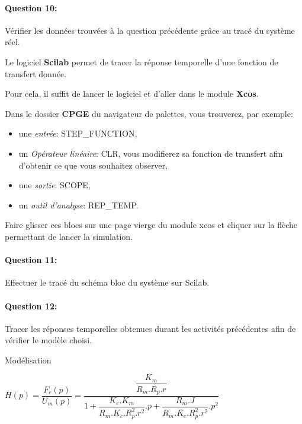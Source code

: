 \paragraph{Question 10:} Vérifier les données trouvées à la question précédente grâce au tracé du système réel.
 
\ifdef{\public}{\cleardoublepage}{}


Le logiciel \textbf{Scilab} permet de tracer la réponse temporelle d'une fonction de transfert donnée.

Pour cela, il suffit de lancer le logiciel et d'aller dans le module \textbf{Xcos}.

Dans le dossier \textbf{CPGE} du navigateur de palettes, vous trouverez, par exemple:
\begin{itemize}
 \item une \textit{entrée}: STEP\_FUNCTION,
 \item un \textit{Opérateur linéaire}: CLR, vous modifierez sa fonction de transfert afin d'obtenir ce que vous souhaitez observer,
 \item une \textit{sortie}: SCOPE,
 \item un \textit{outil d'analyse}: REP\_TEMP.
\end{itemize}

Faire glisser ces blocs sur une page vierge du module xcos et cliquer sur la flèche permettant de lancer la simulation.

\paragraph{Question 11:} Effectuer le tracé du schéma bloc du système sur Scilab.

\paragraph{Question 12:} Tracer les réponses temporelles obtenues durant les activités précédentes afin de vérifier le modèle choisi.

\ifdef{\public}{}{}

\newpage

\pagestyle{correction}\setcounter{section}{0}

Modélisation
\begin{center}
$H(p)=\dfrac{F_c(p)}{U_m(p)}=\dfrac{\dfrac{K_m}{R_m.R_p.r}}{1+\dfrac{K_e.K_m}{R_m.K_c.R_p^2.r^2}.p+\dfrac{R_m.J}{R_m.K_c.R_p^2.r^2}.p^2}$
\end{center}

